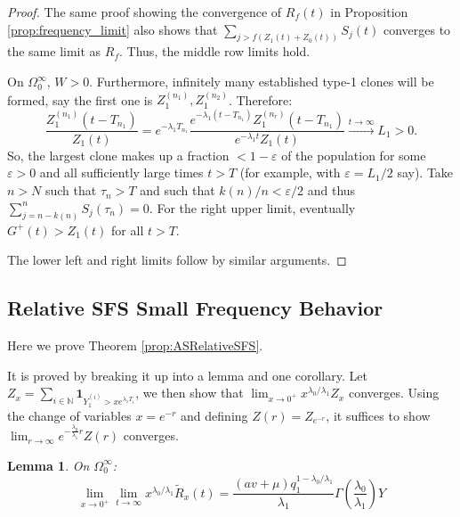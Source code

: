 \documentclass{article}
\numberwithin{equation}{section}
\newtheorem{lemma}{Lemma}
\begin{document}
\ScaleSumSFS*
\begin{proof}
  The same proof showing the convergence of $R_f(t)$ in Proposition \ref{prop:frequency_limit} also shows that $\sum_{j>f(Z_1(t)+Z_0(t))}S_j(t)$ converges to the same limit as $R_f$. Thus, the middle row limits hold.

  On $\Omega_0^\infty$, $W>0$. Furthermore, infinitely many established type-1 clones will be formed, say the first one is $Z_1^{(n_1)},Z_1^{(n_2)}$. Therefore:
  \[
  \frac{Z_1^{(n_1)}(t-T_{n_1})}{Z_1(t)}=e^{-\lambda_1 T_{n_1}}\frac{e^{-\lambda_1(t-T_{n_1})}Z_1^{(n_r)}(t-T_{n_1})}{e^{-\lambda_1 t}Z_1(t)}\overset{t\to\infty}{\to} L_1>0.
  \]
So, the largest clone makes up a fraction $<1-\varepsilon$ of the population for some $\varepsilon>0$ and all sufficiently large times $t>T$ (for example, with $\varepsilon=L_1/2$ say). Take $n>N$ such that $\tau_n>T$ and such that $k(n)/n<\varepsilon/2$ and thus $\sum_{j=n-k(n)}^n S_j(\tau_n)=0$. For the right upper limit, eventually $G^+(t)>Z_1(t)$ for all $t>T$.

  The lower left and right limits follow by similar arguments.
\end{proof}

\subsection{Relative SFS Small Frequency Behavior}\label{app:relSFS}

Here we prove Theorem \ref{prop:ASRelativeSFS}.

\ASRelativeSFS*

It is proved by breaking it up into a lemma and one corollary. Let $Z_x=\sum_{i\in \mathbb{N}}\mathbf{1}_{Y_1^{(i)}> xe^{\lambda_1 T_i}}$, we then show that $\lim_{x\to 0^+}x^{\lambda_0/\lambda_1}Z_x$ converges. Using the change of variables $x=e^{-r}$ and defining $Z(r)=Z_{e^{-r}}$, it suffices to show $\lim_{r\to \infty}e^{-\frac{\lambda_0}{\lambda_1}r}Z(r)$ converges.

\begin{lemma}
  On $\Omega_0^\infty$:
  \[\lim_{x\to0^+}\lim_{t\to\infty}x^{\lambda_0/\lambda_1}\widetilde{R}_x(t)=\frac{(av+\mu)q_1^{1-\lambda_0/\lambda_1}}{\lambda_1}\Gamma\left(\frac{\lambda_0}{\lambda_1}\right)Y\]
  \label{lem:small_x_behavior_approx}
\end{lemma}
\end{document}
